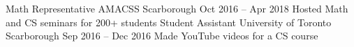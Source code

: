 \begin{cvhonors}
  \cvhonor
    {Math Representative}
    {AMACSS}
    {Scarborough}
    {Oct 2016 -- Apr 2018}
    {Hosted Math and CS seminars for 200+ students}
  \cvhonor
    {Student Assistant}
    {University of Toronto}
    {Scarborough}
    {Sep 2016 -- Dec 2016}
    {Made YouTube videos for a CS course}
\end{cvhonors}